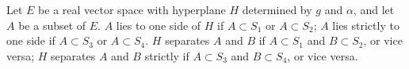 Let $E$ be a real vector space with hyperplane $H$ determined by $g$ and $\alpha$, and let $A$ be a subset of $E$. $A$ lies to one side of $H$ if $A \subset S_1$ or $A \subset S_2$; $A$ lies strictly to one side if $A \subset S_3$ or $A \subset S_4$. $H$ separates $A$ and $B$ if $A \subset S_1$ and $B \subset S_2$, or vice versa; $H$ separates $A$ and $B$ strictly if $A \subset S_3$ and $B \subset S_4$, or vice versa.